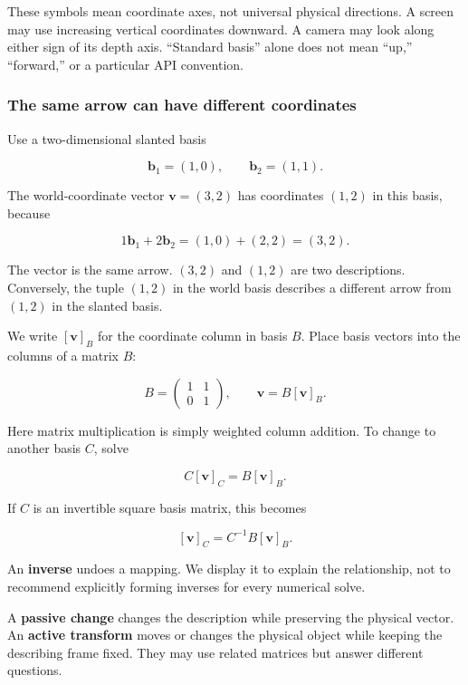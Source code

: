 These symbols mean coordinate axes, not universal physical directions. A screen may use increasing vertical coordinates downward. A camera may look along either sign of its depth axis. ``Standard basis'' alone does not mean ``up,'' ``forward,'' or a particular API convention.

\subsubsection{The same arrow can have different coordinates}\label{01-foundations-i-ch017-the-same-arrow-can-have-different-coordinates}

\hypertarget{01-foundations-i-ch017-the-same-arrow-can-have-different-coordinates}{}

Use a two-dimensional slanted basis

\[
\mathbf b_1=(1,0),\qquad \mathbf b_2=(1,1).
\]

The world-coordinate vector \(\mathbf v=(3,2)\) has coordinates \((1,2)\) in this basis, because

\[
1\mathbf b_1+2\mathbf b_2=(1,0)+(2,2)=(3,2).
\]

The vector is the same arrow. \((3,2)\) and \((1,2)\) are two descriptions. Conversely, the tuple \((1,2)\) in the world basis describes a different arrow from \((1,2)\) in the slanted basis.

We write \([\mathbf v]_B\) for the coordinate column in basis \(B\). Place basis vectors into the columns of a matrix \(B\):

\[
B=\begin{pmatrix}1&1\\0&1\end{pmatrix},\qquad
\mathbf v=B[\mathbf v]_B.
\]

Here matrix multiplication is simply weighted column addition. To change to another basis \(C\), solve

\[
C[\mathbf v]_C=B[\mathbf v]_B.
\]

If \(C\) is an invertible square basis matrix, this becomes

\[
[\mathbf v]_C=C^{-1}B[\mathbf v]_B.
\]

An \textbf{inverse} undoes a mapping. We display it to explain the relationship, not to recommend explicitly forming inverses for every numerical solve.

A \textbf{passive change} changes the description while preserving the physical vector. An \textbf{active transform} moves or changes the physical object while keeping the describing frame fixed. They may use related matrices but answer different questions.

